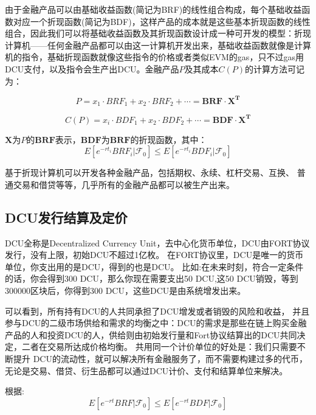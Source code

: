 \documentclass[letterpaper,11pt]{ctexart}
\begin{document}
由于金融产品可以由基础收益函数(简记为BRF)的线性组合构成，每个基础收益函数对应一个折现函数(简记为BDF)，这样产品的成本就是这些基本折现函数的线性组合，因此我们可以将基础收益函数及其折现函数设计成一种可开发的模型：折现计算机——任何金融产品都可以由这一计算机开发出来，基础收益函数就像是计算机的指令，基础折现函数就像这些指令的价格或者类似EVM的gas，只不过gas用DCU支付，以及指令会生产出DCU。金融产品$P$及其成本$C(P)$的计算方法可记为：


\begin{equation}
P=x_1\cdot BRF_1+x_2\cdot BRF_2+\cdots=\boldsymbol{BRF}\cdot \boldsymbol{X^T}
\end{equation}

\begin{equation} 
C(P)=x_i\cdot BDF_1+x_2\cdot BDF_2+\cdots=\boldsymbol{BDF}\cdot \boldsymbol{X^T}
\end{equation}

$\boldsymbol{X}$为$P$的$\boldsymbol{BRF}$表示，$\boldsymbol{BDF}$为$\boldsymbol{BRF}$的折现函数，其中：
\begin{equation}
E\left[e^{-rt_{i}}BRF_{i}|\mathcal{F}_0\right] \leq E\left[e^{-rt_{i}}BDF_{i}|\mathcal{F}_0\right] 
\label{eq4}
\end{equation}

基于折现计算机可以开发各种金融产品，包括期权、永续、杠杆交易、互换、 普通交易和借贷等等，几乎所有的金融产品都可以被生产出来。

\subsection{DCU发行结算及定价}
DCU全称是Decentralized Currency Unit，去中心化货币单位，DCU由FORT协议发行，没有上限，初始DCU不超过1亿枚。
在FORT协议里，DCU是唯一的货币单位，你支出用的是DCU，得到的也是DCU。
比如:在未来时刻，符合一定条件的话，你会得到300 DCU，那么你现在需要支出50 DCU,这50 DCU销毁，等到300000区块后，你得到300 DCU，这些DCU是由系统增发出来。

可以看到，所有持有DCU的人共同承担了DCU增发或者销毁的风险和收益， 并且参与DCU的二级市场供给和需求的均衡之中：DCU的需求是那些在链上购买金融产品的人和投资DCU的人，供给则由初始发行量和Fort协议结算出的DCU共同决定，二者在交易所达成价格均衡。
共用同一个计价单位的好处是：我们只需要不断提升 DCU的流动性，就可以解决所有金融服务了，而不需要构建过多的代币，无论是交易、借贷、衍生品都可以通过DCU计价、支付和结算单位来解决。

根据:
\begin{equation}
E\left[e^{-rt}BRF|\mathcal{F}_0\right] \leq E\left[e^{-rt}BDF|\mathcal{F}_0\right] 
\end{equation}
\end{document}
